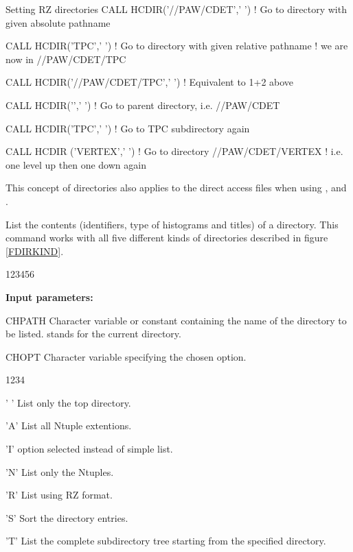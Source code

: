 \begin{XMPt}{Setting RZ directories}
CALL HCDIR('//PAW/CDET',' ')     ! {\rm Go to directory with given absolute pathname}
                                   
CALL HCDIR('TPC',' ')            ! {\rm Go to directory with given relative pathname}
                                 ! {\rm we are now in} //PAW/CDET/TPC

CALL HCDIR('//PAW/CDET/TPC',' ') ! {\rm Equivalent to 1+2 above}

CALL HCDIR('\bs',' ')              ! {\rm Go to parent directory, i.e.} //PAW/CDET

CALL HCDIR('TPC',' ')            ! {\rm Go to TPC subdirectory again}

CALL HCDIR ('\bs{}VERTEX',' ')       ! {\rm Go to directory} //PAW/CDET/VERTEX
                                 ! {\rm i.e. one level up then one down again}
\end{XMPt}

This concept of directories also applies to
the direct access files when using , 
and .

 
\Action
List the contents (identifiers, type of histograms
and titles) of a \HBOOK{} directory.
This command works with all five different kinds of directories 
described in figure \ref{FDIRKIND}.
 
\begin{DLtt}{123456}
\item[{\rm\bf Input parameters:}]
\item[CHPATH] Character
variable or constant containing the name of the directory to be listed.
 stands for the current directory.
\item[CHOPT] Character variable specifying the chosen option.
\begin{DLtt}{1234}
\item[' '] List only the top directory.
\item['A'] List all Ntuple extentions.
\item['I']  option selected instead of simple list.
\item['N'] List only the Ntuples.
\item['R'] List using RZ format.
\item['S'] Sort the directory entries.
\item['T'] List the complete subdirectory tree starting
from the specified directory.
\end{DLtt}
\end{DLtt}
 
